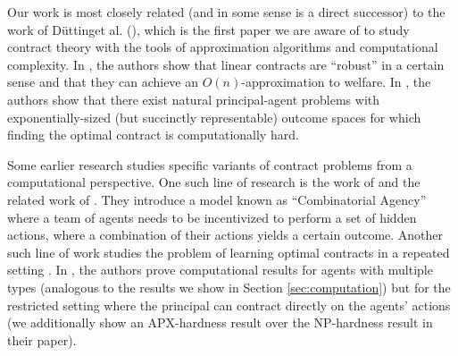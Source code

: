 \documentclass{article}
\newcommand{\dutting}{D{\"u}tting}
\begin{document}
Our work is most closely related (and in some sense is a direct successor) to the work of \dutting et al. (\cite{dutting2019simple, dutting2020complexity}), which is the first paper we are aware of to study contract theory with the tools of approximation algorithms and computational complexity. In \cite{dutting2019simple}, the authors show that linear contracts are ``robust'' in a certain sense and that they can achieve an $O(n)$-approximation to welfare. In \cite{dutting2020complexity}, the authors show that there exist natural principal-agent problems with exponentially-sized (but succinctly representable) outcome spaces for which finding the optimal contract is computationally hard. 

Some earlier research studies specific variants of contract problems from a computational perspective. One such line of research is the work of \cite{babaioff2006agency} and the related work of \cite{babaioff2006mixed,babaioff2009free}. They introduce a model known as ``Combinatorial Agency'' where a team of agents needs to be incentivized to perform a set of hidden actions, where a combination of their actions yields a certain outcome. Another such line of work studies the problem of learning optimal contracts in a repeated setting \cite{ho2016adaptive}. In \cite{xiao2019optimal}, the authors prove computational results for agents with multiple types (analogous to the results we show in Section \ref{sec:computation}) but for the restricted setting where the principal can contract directly on the agents' actions (we additionally show an APX-hardness result over the NP-hardness result in their paper). 

\newcommand{\multirowrotate}[2]{\multirow{#1}{*}{\rotatebox[origin=c]{90}{#2}}}
\end{document}

